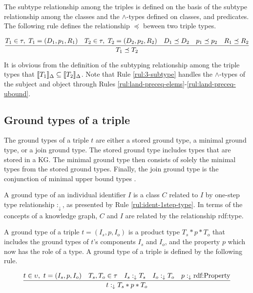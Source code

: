 \documentclass[runningheads]{llncs}
\newcommand{\darr}{\downarrow}
\newcommand{\llb}{\llbracket}
\newcommand{\rrb}{\rrbracket}
\begin{document}
The subtype relationship among the triples is defined on the basis of
the subtype relationship among the classes and the $\land$-types
defined on classes, and predicates. The following rule defines the
relationship $\preceq$ beween two triple types.

\begin{equation}
\label{rul:3-subtype}
\dfrac{T_1\in\tau,\ T_1=(D_1,p_1,R_1)\quad T_2\in\tau,\ T_2=(D_2,p_2,R_2)\quad\/D_1\preceq\/D_2\quad\/p_1\preceq\/p_2\quad\/R_1\preceq\/R_2}
      {T_1\preceq\/T_2}
\end{equation}

It is obvious from the definition of the subtyping relationship among
the triple types that
$\llb\/T_1\rrb_\Delta\subseteq\llb\/T_2\rrb_\Delta$. Note that Rule
\ref{rul:3-subtype} handles the $\land$-types of the subject and
object through Rules
\ref{rul:land-preceq-elems}-\ref{rul:land-preceq-ubound}.







\subsection{Ground types of a triple\label{sec:3-ground-types}}

%
% 

\noindent
The ground types of a triple $t$ are either a stored ground type, a
minimal ground type, or a join ground type. The stored ground type
includes types that are stored in a KG. The minimal ground type then
consists of solely the minimal types from the stored ground
types. Finally, the join ground type is the conjunction of minimal
upper bound types \cite{Knudstorp2024}.
 
A ground type of an individual identifier $I$ is a class $C$ related
to $I$ by one-step type relationship $:_\darr$, as presented by Rule
\ref{rul:ident-1step-type}. In terms of the concepts of a knowledge
graph, $C$ and $I$ are related by the relationship rdf:type.

A ground type of a triple $t=(I_s,p,I_o)$ is a product type
$T_s*p*T_o$ that includes the ground types of $t$'s components $I_s$
and $I_o$, and the property $p$ which now has the role of a type. A
ground type of a triple is defined by the following rule.

\begin{equation}
\label{rul:3-ground}
\dfrac{t\in\upsilon,\ t=(I_s,p,I_o)\quad T_s,T_o\in\tau\quad I_s:_\darr\/T_s\quad I_o:_\darr\/T_o\quad p:_\darr\text{rdf:Property}}
      {t:_\darr\/T_s*p*T_o}
\end{equation}
\end{document}
